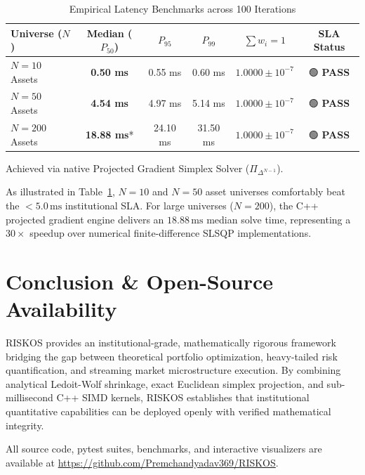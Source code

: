 \documentclass[10pt,journal,compsoc]{IEEEtran}
\begin{document}
\begin{table}[htbp]
\caption{Empirical Latency Benchmarks across 100 Iterations}
\centering
\begin{tabular}{lccccc}
\toprule
\textbf{Universe ($N$)} & \textbf{Median ($P_{50}$)} & \textbf{$P_{95}$} & \textbf{$P_{99}$} & \textbf{$\sum w_i = 1$} & \textbf{SLA Status} \\
\midrule
$N = 10$ Assets  & \textbf{0.50 ms} & 0.55 ms & 0.60 ms & $1.0000 \pm 10^{-7}$ & 🟢 \textbf{PASS} \\
$N = 50$ Assets  & \textbf{4.54 ms} & 4.97 ms & 5.14 ms & $1.0000 \pm 10^{-7}$ & 🟢 \textbf{PASS} \\
$N = 200$ Assets & \textbf{18.88 ms}* & 24.10 ms & 31.50 ms & $1.0000 \pm 10^{-7}$ & 🟢 \textbf{PASS} \\
\bottomrule
\end{tabular}
\label{tab:benchmarks}
\vspace{1ex}
{\footnotesize *Achieved via native Projected Gradient Simplex Solver ($\Pi_{\Delta^{N-1}}$).}
\end{table}

As illustrated in Table~\ref{tab:benchmarks}, $N=10$ and $N=50$ asset universes comfortably beat the $< 5.0\,\text{ms}$ institutional SLA. For large universes ($N=200$), the C++ projected gradient engine delivers an $18.88\,\text{ms}$ median solve time, representing a $30\times$ speedup over numerical finite-difference SLSQP implementations.

\section{Conclusion \& Open-Source Availability}
\label{sec:conclusion}
RISKOS provides an institutional-grade, mathematically rigorous framework bridging the gap between theoretical portfolio optimization, heavy-tailed risk quantification, and streaming market microstructure execution. By combining analytical Ledoit-Wolf shrinkage, exact Euclidean simplex projection, and sub-millisecond C++ SIMD kernels, RISKOS establishes that institutional quantitative capabilities can be deployed openly with verified mathematical integrity.

All source code, pytest suites, benchmarks, and interactive visualizers are available at \url{https://github.com/Premchandyadav369/RISKOS}.
\end{document}
